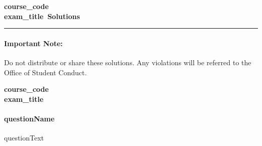 \documentclass[11pt]{article}
\newif\ifsolutions
\newcommand{\coursecode}{{{course_code}}}
\newcommand{\examtitle}{{{exam_title}}}
\begin{document}
\thispagestyle{empty}
\ifsolutions
\begin{center}
\Large\bf\coursecode\\[2pt] \examtitle ~Solutions \\ \large\docdate
\end{center}

\hrule
\paragraph{Important Note:} Do not distribute or share these solutions. Any violations will be referred to the Office of Student Conduct.
\else 
\begin{center}
\Large\bf\coursecode\\[2pt] \examtitle \\
\end{center}

\paragraph{{{questionName}}}
{{questionText}}

\newpage
\end{document}
